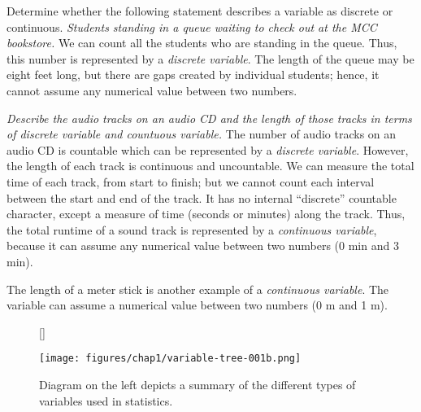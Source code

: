 \begin{example} 
Determine whether the following statement describes a variable as discrete or continuous. {\it{Students standing in a queue waiting to check out at the MCC bookstore.}} We can count all the students who are standing in the queue. Thus, this number is represented by a {\it{discrete variable}}. The length of the queue may be eight feet long, but there are gaps created by individual students; hence, it cannot assume any numerical value between two numbers.  
\end{example} 

\begin{example} 
{\it{Describe the audio tracks on an audio CD and the length of those tracks in terms of discrete variable and countuous variable.}} The number of audio tracks on an audio CD is countable which can be represented by a {\it{discrete variable}}. However, the length of each track is continuous and uncountable. We can measure the total time of each track, from start to finish; but we cannot count each interval between the start and end of the track. It has no internal ``discrete'' countable character, except a measure of time (seconds or minutes) along the track. Thus, the total runtime of a sound track is represented by a {\it{continuous variable}}, because it can assume any numerical value between two numbers (0 min and 3 min).       
\end{example}

\begin{example} 
The length of a meter stick is another example of a {\it{continuous variable}}. The variable can assume a numerical value between two numbers (0 m and 1 m).       
\end{example}

\begin{figure}[H] %
   [\FBwidth]
   {\caption{Diagram on the left depicts a summary of the different types of variables used in statistics.} \label{fig:variable-tree-001a}}
   {\texttt{[image: figures/chap1/variable-tree-001b.png]}}
\end{figure}

%
%

